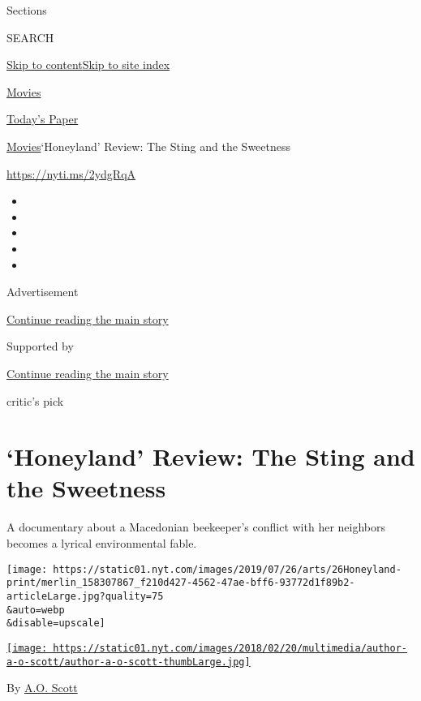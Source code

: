 Sections

SEARCH

\protect\hyperlink{site-content}{Skip to
content}\protect\hyperlink{site-index}{Skip to site index}

\href{https://www.nytimes.com/section/movies}{Movies}

\href{https://myaccount.nytimes.com/auth/login?response_type=cookie\&client_id=vi}{}

\href{https://www.nytimes.com/section/todayspaper}{Today's Paper}

\href{/section/movies}{Movies}\textbar{}`Honeyland' Review: The Sting
and the Sweetness

\href{https://nyti.ms/2ydgRqA}{https://nyti.ms/2ydgRqA}

\begin{itemize}
\item
\item
\item
\item
\item
\end{itemize}

Advertisement

\protect\hyperlink{after-top}{Continue reading the main story}

Supported by

\protect\hyperlink{after-sponsor}{Continue reading the main story}

critic's pick

\hypertarget{honeyland-review-the-sting-and-the-sweetness}{%
\section{`Honeyland' Review: The Sting and the
Sweetness}\label{honeyland-review-the-sting-and-the-sweetness}}

A documentary about a Macedonian beekeeper's conflict with her neighbors
becomes a lyrical environmental fable.

\texttt{[image: https://static01.nyt.com/images/2019/07/26/arts/26Honeyland-print/merlin\_158307867\_f210d427-4562-47ae-bff6-93772d1f89b2-articleLarge.jpg?quality=75\\\&auto=webp\\\&disable=upscale]}

\href{https://www.nytimes.com/by/a-o--scott}{\texttt{[image: https://static01.nyt.com/images/2018/02/20/multimedia/author-a-o-scott/author-a-o-scott-thumbLarge.jpg]}}

By \href{https://www.nytimes.com/by/a-o--scott}{A.O. Scott}

